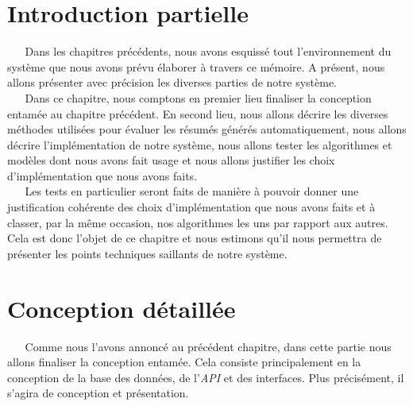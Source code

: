 \section{Introduction partielle}
$ _{} $ $ _{} $ $ _{} $ $ _{} $ $ _{} $Dans les chapitres précédents, nous avons esquissé tout l'environnement du système que nous avons prévu élaborer à travers ce mémoire. A présent, nous allons présenter avec précision les diverses parties de notre système.\\
$ _{} $ $ _{} $ $ _{} $ $ _{} $ $ _{} $Dans ce chapitre, nous comptons en premier lieu finaliser la conception entamée au chapitre précédent. En second lieu, nous allons décrire les diverses méthodes utilisées pour évaluer les résumés générés au\-to\-ma\-ti\-que\-ment, nous allons décrire l'implémentation de notre système, nous allons tester les algorithmes et modèles dont nous avons fait usage et nous allons justifier les choix d'implémentation que nous avons faits.\\
$ _{} $ $ _{} $ $ _{} $ $ _{} $ $ _{} $Les tests en particulier seront faits de manière à pouvoir donner une justification cohérente des choix d'implémentation que nous avons faits et à classer, par la même occasion, nos algorithmes les uns par rapport aux autres. Cela est donc l'objet de ce chapitre et nous estimons qu'il nous permettra de présenter les points techniques saillants de notre système.
\section{Conception détaillée}
$ _{} $ $ _{} $ $ _{} $ $ _{} $ $ _{} $Comme nous l'avons annoncé au précédent chapitre, dans cette partie nous allons finaliser la conception entamée. Cela consiste principalement en la conception de la base des données, de l'\textit{API} et des interfaces. Plus précisément, il s'agira de conception et présentation.\newpage
